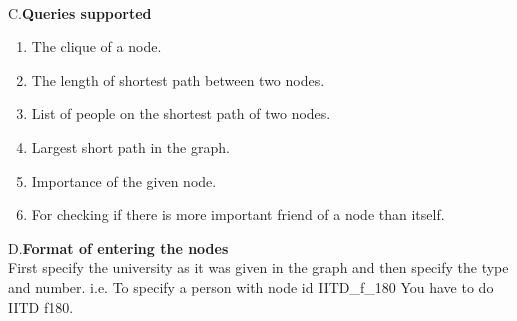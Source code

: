 \documentclass[a4paper,14pt]{article}
\begin{document}
\begin{flushleft}
\\[0.1in]C.\large\textbf{Queries supported}\\
\begin{enumerate}
\item The clique of a node.
\item The length of shortest path between two nodes.
\item List of people on the shortest path of two nodes.
\item Largest short path in the graph.
\item Importance of the given node.
\item For checking if there is more important friend of a node than itself.
\end{enumerate}
D.\large\textbf{Format of entering the nodes}\\
First specify the university as it was given in the graph and then specify the type and number.
i.e. To specify a person with node id IITD\_f\_180 You have to do IITD f180.

\end{flushleft}
\end{document}
